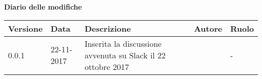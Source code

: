 \documentclass[Verbale.tex]{subfiles}
\begin{document}
\huge \bfseries Diario delle modifiche\\
\begin{table}[htbp]
	\centering
	\renewcommand\arraystretch{1.2}

	\begin{tabularx}{\textwidth}{p{2cm}|p{2cm}|p{3cm}|p{2cm}|p{3cm}}
		\hline
		\textbf{Versione} & \textbf{Data} & \textbf{Descrizione} & \textbf{Autore} & \textbf{Ruolo}\\
		\hline
		0.0.1 & 22-11-2017 & Inserita la discussione avvenuta su Slack il 22 ottobre 2017& \Mirco & -\\
	
	\end{tabularx}

\end{table}
\end{document}
